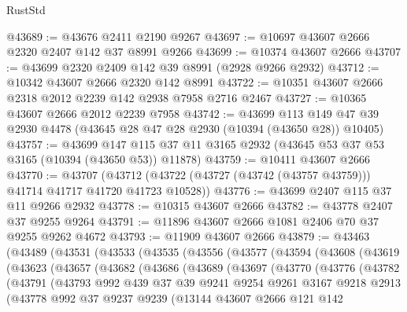 \begin{lexlean}{RustStd}
\begin{coremodule}
@43689 := @43676 @2411 @2190 @9267
@43697 := @10697 @43607 @2666 @2320 @2407 @142 @37 @8991 @9266
@43699 := @10374 @43607 @2666
@43707 := @43699 @2320 @2409 @142 @39 @8991 (@2928 @9266 @2932)
@43712 := @10342 @43607 @2666 @2320 @142 @8991
@43722 := @10351 @43607 @2666 @2318 @2012 @2239 @142 @2938 @7958 @2716 @2467
@43727 := @10365 @43607 @2666 @2012 @2239 @7958
@43742 := @43699
    @113
    @149
    @47
    @39
    @2930
    @4478
    (@43645 @28 @47 @28 @2930 (@10394 (@43650 @28)) @10405)
@43757 := @43699
    @147
    @115
    @37
    @11
    @3165
    @2932
    (@43645 @53 @37 @53 @3165 (@10394 (@43650 @53)) @11878)
@43759 := @10411 @43607 @2666
@43770 := @43707
    (@43712 (@43722 (@43727 (@43742 (@43757 @43759))) @41714 @41717 @41720 @41723 @10528))
@43776 := @43699 @2407 @115 @37 @11 @9266 @2932
@43778 := @10315 @43607 @2666
@43782 := @43778 @2407 @37 @9255 @9264
@43791 := @11896 @43607 @2666 @1081 @2406 @70 @37 @9255 @9262 @4672
@43793 := @11909 @43607 @2666
@43879 := @43463
    (@43489
      (@43531
        (@43533
          (@43535
            (@43556
              (@43577
                (@43594
                  (@43608
                    (@43619
                      (@43623
                        (@43657
                          (@43682
                            (@43686
                              (@43689
                                (@43697
                                  (@43770
                                    (@43776
                                      (@43782
                                        (@43791
                                          (@43793
                                            @992
                                            @439
                                            @37
                                            @39
                                            @9241
                                            @9254
                                            @9261
                                            @3167
                                            @9218
                                            @2913
                                            (@43778
                                              @992
                                              @37
                                              @9237
                                              @9239
                                              (@13144
                                                @43607
                                                @2666
                                                @121
                                                @142

\end{coremodule}
\end{lexlean}
